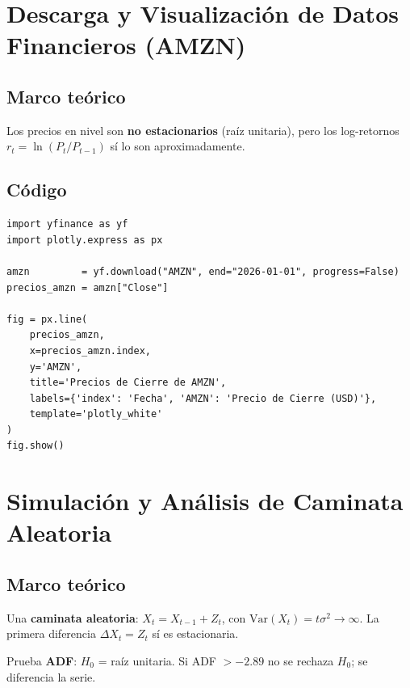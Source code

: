 \documentclass[12pt,letterpaper]{article}
\begin{document}
\section{Descarga y Visualizaci\'on de Datos Financieros (AMZN)}

\subsection{Marco te\'orico}

Los precios en nivel son \textbf{no estacionarios} (ra\'iz unitaria), pero los
log-retornos $r_t = \ln(P_t/P_{t-1})$ s\'i lo son aproximadamente.

\subsection{C\'odigo}

\begin{lstlisting}[style=python, caption={Descarga de precios AMZN con yfinance}]
import yfinance as yf
import plotly.express as px

amzn         = yf.download("AMZN", end="2026-01-01", progress=False)
precios_amzn = amzn["Close"]

fig = px.line(
    precios_amzn,
    x=precios_amzn.index,
    y='AMZN',
    title='Precios de Cierre de AMZN',
    labels={'index': 'Fecha', 'AMZN': 'Precio de Cierre (USD)'},
    template='plotly_white'
)
fig.show()
\end{lstlisting}

\section{Simulaci\'on y An\'alisis de Caminata Aleatoria}

\subsection{Marco te\'orico}

Una \textbf{caminata aleatoria}: $X_t = X_{t-1} + Z_t$, con
$\mathrm{Var}(X_t) = t\sigma^2 \to \infty$. La primera diferencia
$\Delta X_t = Z_t$ s\'i es estacionaria.

Prueba \textbf{ADF}: $H_0$ = ra\'iz unitaria. Si ADF $> -2.89$
no se rechaza $H_0$; se diferencia la serie.
\end{document}
